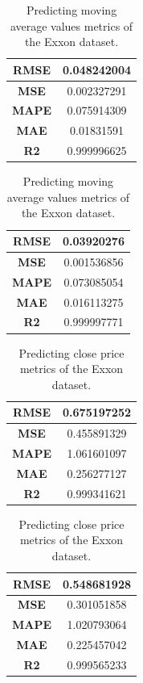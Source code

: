 \begin{table}[H]
	\centering
	\begin{minipage}{0.45\textwidth}
		\centering
		\begin{tabular}{|c|c|}
			\hline
			\textbf{RMSE} & 0.048242004 \\
			\hline
			\textbf{MSE}  & 0.002327291 \\
			\hline
			\textbf{MAPE} & 0.075914309 \\
			\hline
			\textbf{MAE}  & 0.01831591  \\
			\hline
			\textbf{R2}   & 0.999996625 \\
			\hline
		\end{tabular}
	\end{minipage}
	\begin{minipage}{0.45\textwidth}
		\centering
		\begin{tabular}{|c|c|}
			\hline
			\textbf{RMSE} & 0.03920276  \\
			\hline
			\textbf{MSE}  & 0.001536856 \\
			\hline
			\textbf{MAPE} & 0.073085054 \\
			\hline
			\textbf{MAE}  & 0.016113275 \\
			\hline
			\textbf{R2}   & 0.999997771 \\
			\hline
		\end{tabular}
	\end{minipage}
	\caption{Predicting moving average values metrics of the Exxon dataset.}
	\label{metric:exx_mva}
\end{table}
\begin{table}[H]
	\centering
	\begin{minipage}{0.45\textwidth}
		\centering
		\begin{tabular}{|c|c|}
			\hline
			\textbf{RMSE} & 0.675197252 \\
			\hline
			\textbf{MSE}  & 0.455891329 \\
			\hline
			\textbf{MAPE} & 1.061601097 \\
			\hline
			\textbf{MAE}  & 0.256277127 \\
			\hline
			\textbf{R2}   & 0.999341621 \\
			\hline
		\end{tabular}
	\end{minipage}
	\begin{minipage}{0.45\textwidth}
		\centering
		\begin{tabular}{|c|c|}
			\hline
			\textbf{RMSE} & 0.548681928 \\
			\hline
			\textbf{MSE}  & 0.301051858 \\
			\hline
			\textbf{MAPE} & 1.020793064 \\
			\hline
			\textbf{MAE}  & 0.225457042 \\
			\hline
			\textbf{R2}   & 0.999565233 \\
			\hline
		\end{tabular}
	\end{minipage}
	\caption{Predicting close price metrics of the Exxon dataset.}
	\label{metric:exx_close}
\end{table}
